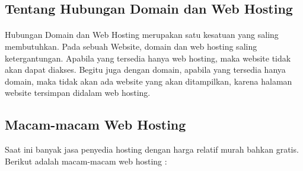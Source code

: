 \documentclass[12pt, a4paper]{article}
\begin{document}
\subsection{Tentang Hubungan Domain dan Web Hosting}
\paragraph{}Hubungan Domain dan Web Hosting merupakan satu kesatuan yang saling membutuhkan.
Pada sebuah Website, domain dan web hosting saling ketergantungan. Apabila yang tersedia hanya web hosting, maka website tidak akan dapat diakses. Begitu juga dengan domain, apabila yang tersedia hanya domain, maka tidak akan ada website yang akan ditampilkan, karena halaman website tersimpan didalam web hosting.

\subsection{Macam-macam Web Hosting}
Saat ini banyak jasa penyedia hosting dengan harga relatif murah bahkan gratis.
Berikut adalah macam-macam web hosting :
\end{document}
